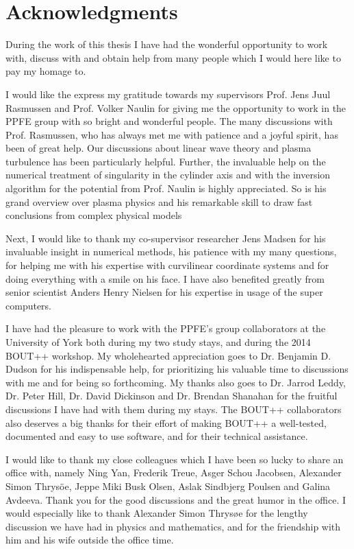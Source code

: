 \chapter*{Acknowledgments}
%
During the work of this thesis I have had the wonderful opportunity to work with, discuss with and obtain help from many people which I would here like to pay my homage to.

I would like the express my gratitude towards my supervisors Prof. Jens Juul Rasmussen and Prof. Volker Naulin for giving me the opportunity to work in the PPFE group with so bright and wonderful people.
The many discussions with Prof. Rasmussen, who has always met me with patience and a joyful spirit, has been of great help.
Our discussions about linear wave theory and plasma turbulence has been particularly helpful.
Further, the invaluable help on the numerical treatment of singularity in the cylinder axis and with the inversion algorithm for the potential from Prof. Naulin is highly appreciated.
So is his grand overview over plasma physics and his remarkable skill to draw fast conclusions from complex physical models

Next, I would like to thank my co-supervisor researcher Jens Madsen for his invaluable insight in numerical methods, his patience with my many questions, for helping me with his expertise with curvilinear coordinate systems and for doing everything with a smile on his face.
I have also benefited greatly from senior scientist Anders Henry Nielsen for his expertise in usage of the super computers.

I have had the pleasure to work with the PPFE's group collaborators at the University of York both during my two study stays, and during the 2014 BOUT++ workshop.
My wholehearted appreciation goes to Dr. Benjamin D. Dudson for his indispensable help, for prioritizing his valuable time to discussions with me and for being so forthcoming.
My thanks also goes to Dr. Jarrod Leddy, Dr. Peter Hill, Dr. David Dickinson and Dr. Brendan Shanahan for the fruitful discussions I have had with them during my stays.
The BOUT++ collaborators also deserves a big thanks for their effort of making BOUT++ a well-tested, documented and easy to use software, and for their technical assistance.

I would like to thank my close colleagues which I have been so lucky to share an office with, namely Ning Yan, Frederik Treue, Asger Schou Jacobsen, Alexander Simon Thrys{\"o}e, Jeppe Miki Busk Olsen, Aslak Sindbjerg Poulsen and Galina Avdeeva. Thank you for the good discussions and the great humor in the office.
I would especially like to thank Alexander Simon Thrys{\o}e for the lengthy discussion we have had in physics and mathematics, and for the friendship with him and his wife outside the office time.

